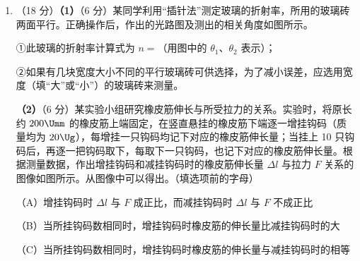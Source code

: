 \documentclass[\gkver]{gaokaozhenti}
\begin{document}
\begin{enumerate}

{$E=\left|\frac{kqR_{1}}{[R_{1}^{2}+(a+r)^{2}]^{3/2}}-\frac{kqR_{2}}{[R_{2}^{2}+(a-r)^{2}]^{3/2}}\right|$}
{$E=\left|\frac{kq(a+r)}{R_{1}^{2}+(a+r)^{2}}-\frac{kq(a-r)}{R_{2}^{2}+(a-r)^{2}}\right|$}
{$E=\left|\frac{kq(a+r)}{[R_{1}^{2}+(a+r)^{2}]^{3/2}}-\frac{kq(a-r)}{[R_{2}^{2}+(a-r)^{2}]^{3/2}}\right|$}

\item
（18 分）\textbf{（1）}（6 分）某同学利用“插针法”测定玻璃的折射率，所用的玻璃砖两面平行。正确操作后，作出的光路图及测出的相关角度如图所示。

①此玻璃的折射率计算式为 $n=$（用图中的 $\theta_{1}$、$\theta_{2}$ 表示）；

②如果有几块宽度大小不同的平行玻璃砖可供选择，为了减小误差，应选用宽度（填“大”或“小”）的玻璃砖来测量。


\textbf{（2）}（6 分）某实验小组研究橡皮筋伸长与所受拉力的关系。实验时，将原长约 $200\Umm$ 的橡皮筋上端固定，在竖直悬挂的橡皮筋下端逐一增挂钩码（质量均为 $20\Ug$），每增挂一只钩码均记下对应的橡皮筋伸长量；当挂上 10 只钩码后，再逐一把钩码取下，每取下一只钩码，也记下对应的橡皮筋伸长量。根据测量数据，作出增挂钩码和减挂钩码时的橡皮筋伸长量 $\Delta l$ 与拉力 $F$ 关系的图像如图所示。从图像中可以得出。（填选项前的字母）

（A）增挂钩码时 $\Delta l$ 与 $F$ 成正比，而减挂钩码时 $\Delta l$ 与 $F$ 不成正比

（B）当所挂钩码数相同时，增挂钩码时橡皮筋的伸长量比减挂钩码时的大

（C）当所挂钩码数相同时，增挂钩码时橡皮筋的伸长量与减挂钩码时的相等


\end{enumerate}
\end{document}

